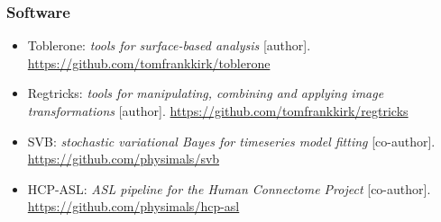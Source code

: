 \clearpage
\subsubsection{Software}
\begin{itemize}
\item{Toblerone: \textit{tools for surface-based analysis} [author]. \url{https://github.com/tomfrankkirk/toblerone}}	
\item{Regtricks: \textit{tools for manipulating, combining and applying image transformations} [author]. \url{https://github.com/tomfrankkirk/regtricks}}
\item{SVB: \textit{stochastic variational Bayes for timeseries model fitting} [co-author]. \url{https://github.com/physimals/svb}}
\item{HCP-ASL: \textit{ASL pipeline for the Human Connectome Project} [co-author]. \url{https://github.com/physimals/hcp-asl}}
\end{itemize}












